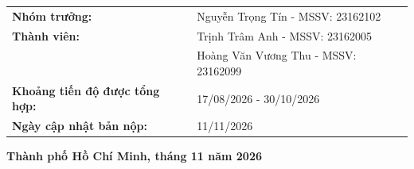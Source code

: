 \documentclass[12pt,a4paper,oneside]{report}
\begin{document}
\begin{titlepage}
\begin{center}
{\begin{tabularx}{0.86\textwidth}{L{6.0cm}Y}
    \textbf{Nhóm trưởng:} & Nguyễn Trọng Tín - MSSV: 23162102 \\
    \textbf{Thành viên:} & Trịnh Trâm Anh - MSSV: 23162005 \\
    & Hoàng Văn Vương Thu - MSSV: 23162099 \\
    \textbf{Khoảng tiến độ được tổng hợp:} & 17/08/2026 - 30/10/2026 \\
    \textbf{Ngày cập nhật bản nộp:} & 11/11/2026 \\
  \end{tabularx}}
\end{center}
\vfill
\begin{center}{\bfseries Thành phố Hồ Chí Minh, tháng 11 năm 2026}\end{center}
\end{titlepage}
\end{document}
